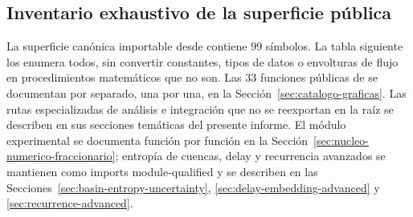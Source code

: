 \subsection{Inventario exhaustivo de la superficie pública}
\label{sec:api-publica-exhaustiva}

La superficie canónica importable desde  contiene
99 símbolos. La tabla siguiente los enumera todos, sin convertir constantes,
tipos de datos o envolturas de flujo en procedimientos matemáticos que no son.
Las 33 funciones públicas de  se
documentan por separado, una por una, en la
Sección~\ref{sec:catalogo-graficas}. Las rutas especializadas de análisis e
integración que no se reexportan en la raíz se describen en sus secciones
temáticas del presente informe. El módulo experimental
 se documenta función por función en la
Sección~\ref{sec:nucleo-numerico-fraccionario}; entropía de cuencas, delay y
recurrencia avanzados se mantienen como imports module-qualified y se describen
en las Secciones~\ref{sec:basin-entropy-uncertainty},
\ref{sec:delay-embedding-advanced} y \ref{sec:recurrence-advanced}.

